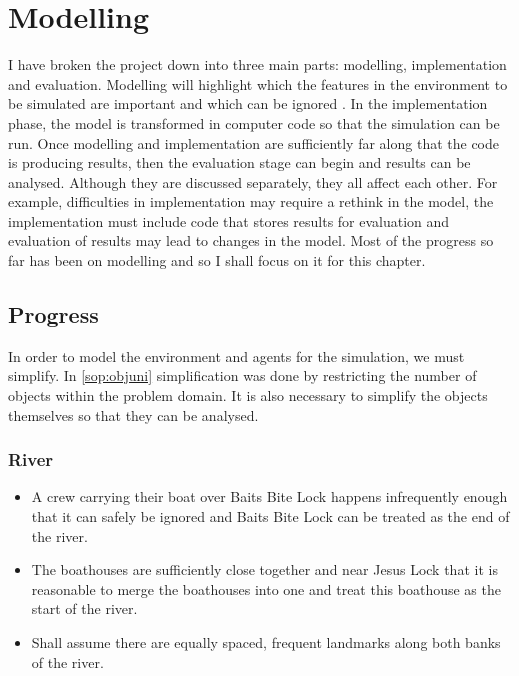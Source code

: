 \chapter{Modelling} 

I have broken
the project down into three main parts: modelling,
implementation and evaluation. Modelling will highlight which the features in the
environment to be simulated are important and which can be ignored
\cite{Sterling2009}. In the implementation phase, the model is transformed in
computer code so that the simulation can be run. Once modelling and
implementation are sufficiently far along that the code is producing
results, then the evaluation stage can begin and results can be
analysed. Although they are discussed separately, they all affect each
other. For example, difficulties in implementation may require a rethink in the
model, the implementation must include code that stores results for
evaluation and evaluation of results may lead to changes in the model. Most of the progress so far has been on modelling and so I shall focus
on it for this chapter.


\section{Progress} \label{prog:model}
In order to model the environment and agents for the simulation, we
must simplify. In \ref{sop:objuni} simplification was done by
restricting the number of 
objects within the problem domain. It is also necessary to
simplify the objects themselves so that they can be analysed.

\subsection{River}
\begin{itemize}
  \item A crew carrying their boat over Baits Bite Lock happens
    infrequently enough that it can safely be ignored and Baits Bite
    Lock can be treated as the end of the river.
  \item The boathouses are sufficiently close together and near Jesus
    Lock that it is reasonable to merge the boathouses into one and
    treat this boathouse as the start of the river. 
  \item Shall assume there are equally spaced, frequent landmarks
    along both banks of the river.
\end{itemize}

